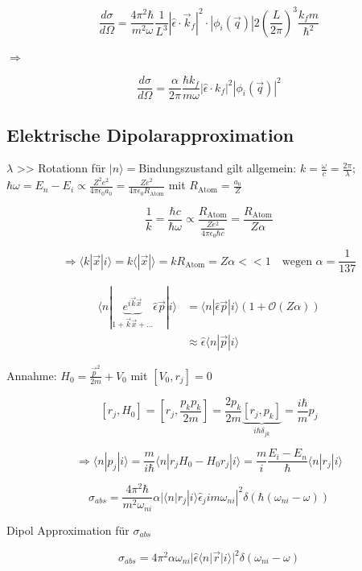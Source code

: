 \[\frac{d\sigma}{d\Omega} = \frac{4\pi^2\hbar}{m^2\omega} \frac{1}{L^3}|\hat \epsilon\cdot\vec k_f|^2\cdot |\phi_i(\vec q)| 2\left(\frac{L}{2\pi}\right)^3\frac{k_fm}{\hbar^2}\]

\(\Rightarrow\)

\[\boxed{\frac{d\sigma}{d\Omega} = \frac{\alpha}{2\pi} \frac{\hbar k_f}{m\omega}|\hat \epsilon\cdot k_f|^2|\phi_i(\vec q)|^2  }\]

\subsection{Elektrische Dipolarapproximation}

\(\lambda\) >> Rotationn für \(|n\rangle=\)Bindungszustand gilt allgemein: \(k=\frac{\omega}{c}=\frac{2\pi}{\lambda}\); \(\hbar\omega = E_n-E_i\propto \frac{Z^2e^2}{4\pi\epsilon_0 a_0}=\frac{Ze^2}{4\pi\epsilon_0 R_{\text{Atom}}}\) mit \(R_{\text{Atom}}=\frac{a_0}{Z}\)

\[\frac{1}{k}=\frac{\hbar c}{\hbar \omega}\propto \frac{R_{\text{Atom}}}{\frac{Ze^2}{4\pi\epsilon_0\hbar c}} = \frac{R_{\text{Atom}}}{Z\alpha}\]

\[\Rightarrow \langle k|\vec x|i\rangle  = k\langle |\vec x|\rangle = kR_{\text{Atom}} = Z\alpha <<1 \quad\text{wegen }\alpha=\frac{1}{137}\]

\begin{align}
  \langle n|\underbrace{e^{i\vec k\vec x}}_{1+\vec k\vec x+...}\hat \epsilon \vec p|i\rangle &=\langle n|\hat \epsilon\vec p|i\rangle (1+\mathcal O(Z\alpha))\\
  &\approx \hat \epsilon \langle n|\vec p|i\rangle
\end{align}

Annahme: \(H_0 = \frac{\vec p^2}{2m}+V_0\) mit \([V_0,r_j]=0\)

\[[r_{j},H_0]=[r_{j},\frac{p_kp_k}{2m}] = \frac{2p_k}{2m}\underbrace{[r_{j},p_k]}_{i\hbar\delta_{jk}} = \frac{i\hbar}{m}p_j\]

\[\Rightarrow \langle n|p_j|i\rangle = \frac{m}{i\hbar}\langle n|r_jH_0-H_0r_j|i\rangle =\frac{m}{i}\frac{E_i-E_n}{\hbar}\langle n|r_j|i\rangle \]

\[\sigma_{abs} = \frac{4\pi^2\hbar}{m^2\omega_{ni}}\alpha|\langle n|r_j|i\rangle \hat \epsilon_j im\omega_{ni}|^2\delta(\hbar(\omega_{ni}-\omega))\]

Dipol Approximation für \(\sigma_{abs}\)

\[\boxed{\sigma_{abs}=4\pi^2\alpha\omega_{ni}|\hat\epsilon\langle n|\vec r|i\rangle|^2\delta(\omega_{ni}-\omega)  }\]

